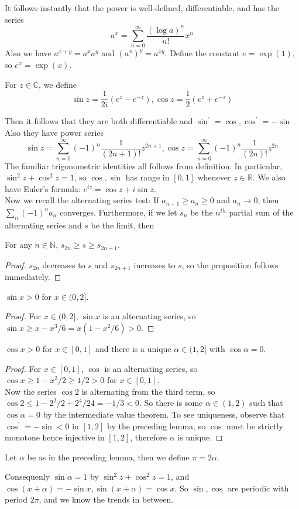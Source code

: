 It follows instantly that the power is well-defined, differentiable, and has the series
$$a^x=\sum_{n=0}^\infty\frac{(\log a)^n}{n!}x^n$$
Also we have $a^{x+y}=a^xa^y$ and $(a^x)^y=a^{xy}$.
Define the constant $e=\exp(1)$, so $e^x=\exp(x)$.
\begin{definition}
    For $z\in\mathbb C$, we define
    $$\sin z=\frac{1}{2i}(e^z-e^{-z}),\cos z=\frac{1}{2}(e^z+e^{-z})$$
\end{definition}
Then it follows that they are both differentiable and $\sin^\prime=\cos,\cos^\prime=-\sin$
Also they have power series
$$\sin z=\sum_{n=0}^\infty(-1)^n\frac{1}{(2n+1)!}z^{2n+1},\cos z=\sum_{n=0}^\infty(-1)^n\frac{1}{(2n)!}z^{2n}$$
The familiar trigonometric identities all follows from definition.
In particular, $\sin^2z+\cos^2z=1$, so $\cos,\sin$ has range in $[0,1]$ whenever $z\in\mathbb R$.
We also have Euler's formula: $e^{iz}=\cos z+i\sin z$.\\
Now we recall the alternating series test: If $a_{n+1}\ge a_n\ge 0$ and $a_n\to 0$, then $\sum_n(-1)^na_n$ converges.
Furthermore, if we let $s_n$ be the $n^{th}$ partial sum of the alternating series and $s$ be the limit, then
\begin{proposition}
    For any $n\in\mathbb N$, $s_{2n}\ge s\ge s_{2n+1}$.
\end{proposition}
\begin{proof}
    $s_{2n}$ decreases to $s$ and $s_{2n+1}$ increases to $s$, so the proposition follows immediately.
\end{proof}
\begin{lemma}
    $\sin x>0$ for $x\in (0,2]$.
\end{lemma}
\begin{proof}
    For $x\in (0,2]$, $\sin x$ is an alternating series, so $\sin x\ge x-x^3/6=x(1-x^2/6)>0$.
\end{proof}
\begin{lemma}
    $\cos x>0$ for $x\in [0,1]$ and there is a unique $\alpha\in (1,2]$ with $\cos\alpha=0$.
\end{lemma}
\begin{proof}
    For $x\in [0,1]$, $\cos$ is an alternating series, so $\cos x\ge 1-x^2/2\ge 1/2>0$ for $x\in [0,1]$.\\
    Now the series $\cos 2$ is alternating from the third term, so $\cos 2\le 1-2^2/2+2^4/24=-1/3<0$.
    So there is some $\alpha\in (1,2)$ such that $\cos\alpha=0$ by the intermediate value theorem.
    To see uniqueness, observe that $\cos^\prime=-\sin<0$ in $[1,2]$ by the preceding lemma, so $\cos$ must be strictly monotone hence injective in $[1,2]$, therefore $\alpha$ is unique.
\end{proof}
\begin{definition}
    Let $\alpha$ be as in the preceding lemma, then we define $\pi=2\alpha$.
\end{definition}
Consequenly $\sin\alpha=1$ by $\sin^2z+\cos^2z=1$, and $\cos(x+\alpha)=-\sin x,\sin(x+\alpha)=\cos x$.
So $\sin,\cos$ are periodic with period $2\pi$, and we know the trends in between.